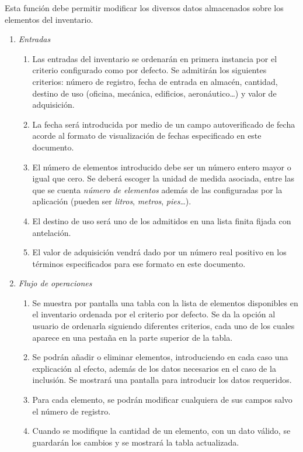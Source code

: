  \label{fun:modinventario}
	Esta función debe permitir modificar los diversos datos almacenados sobre los elementos del inventario.

\begin{enumerate}
	\item \textit{Entradas}
	\begin{enumerate}
		\item Las entradas del inventario se ordenarán en primera instancia por el criterio configurado como por defecto. Se admitirán los siguientes criterios: número de registro, fecha de entrada en almacén, cantidad, destino de uso (oficina, mecánica, edificios, aeronáutico\ldots) y valor de adquisición.
		\item La fecha será introducida por medio de un campo autoverificado de fecha acorde al formato de visualización de fechas especificado en este documento.
		\item El número de elementos introducido debe ser un número entero mayor o igual que cero. Se deberá escoger la unidad de medida asociada, entre las que se cuenta \textit{número de elementos} además de las configuradas por la aplicación (pueden ser \textit{litros}, \textit{metros}, \textit{pies}\ldots).
		\item El destino de uso será uno de los admitidos en una lista finita fijada con antelación.
		\item El valor de adquisición vendrá dado por un número real positivo en los términos especificados para ese formato en este documento.	%
	\end{enumerate}
	\item \textit{Flujo de operaciones}
	\begin{enumerate}
		\item Se muestra por pantalla una tabla con la lista de elementos disponibles en el inventario ordenada por el criterio por defecto. Se da la opción al usuario de ordenarla siguiendo diferentes criterios, cada uno de los cuales aparece en una pestaña en la parte superior de la tabla.
		\item Se podrán añadir o eliminar elementos, introduciendo en cada caso una explicación al efecto, además de los datos necesarios en el caso de la inclusión. Se mostrará una pantalla para introducir los datos requeridos.
		\item Para cada elemento, se podrán modificar cualquiera de sus campos salvo el número de registro.
		\item Cuando se modifique la cantidad de un elemento, con un dato válido, se guardarán los cambios y se mostrará la tabla actualizada.

\end{enumerate}
\end{enumerate}

